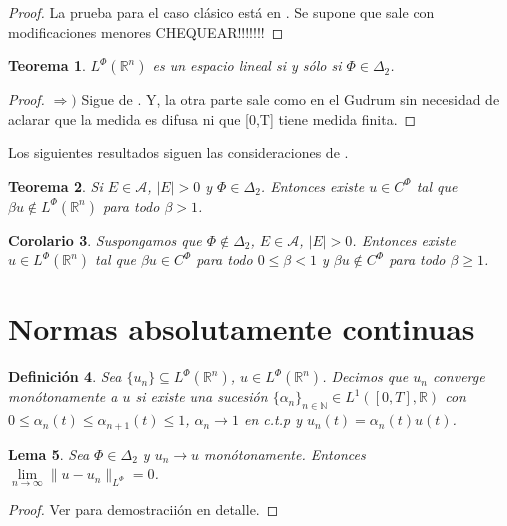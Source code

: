 \documentclass[a4paper,11pt]{amsart}
\theoremstyle{plain}
\newtheorem{thm}{Teorema}[section]
\newtheorem{lem}[thm]{Lema}
\newtheorem{cor}[thm]{Corolario }
\newtheorem{defi}[thm]{Definici\'on}
\theoremstyle{remark}
\theoremstyle{remark}
\newcommand{\rr}{\mathbb{R}}
\newcommand{\nn}{\mathbb{N}}
\numberwithin{equation}{section}
\begin{document}
\begin{proof}
La prueba para el caso cl\'asico est\'a en \cite[Prop. 4, pp. 56-57]{RR91}. Se supone que sale con modificaciones menores CHEQUEAR!!!!!!!
\end{proof}


\begin{thm}
$L^{\Phi}(\rr^n)$ es un espacio lineal si y s\'olo si $\Phi \in \Delta_2$.
\end{thm}

\begin{proof}
$\Rightarrow)$  Sigue de \cite[Thm. 2, pp. 46-47]{RR91}. Y, la otra parte sale como en el Gudrum sin necesidad de aclarar que la medida es difusa ni que  [0,T] tiene medida finita. 
\end{proof}


Los siguientes resultados siguen las consideraciones de \cite[Sub-cap 4]{skaff1969}.

\begin{thm}
Si $E\in \mathcal{A}$,  $|E|>0$ y $\Phi \in \Delta_2$. Entonces existe $u \in C^{\Phi}$ tal que $\beta u \notin L^{\Phi}(\rr^n)$ para todo $\beta>1$.
\end{thm}

\begin{cor}
Suspongamos que $\Phi \notin \Delta_2$, $E \in \mathcal{A}$, $|E|>0$. Entonces existe $u \in L^{\Phi}(\rr^n)$ tal que
$\beta u \in C^{\Phi}$ para todo $0\leq \beta <1$ y $\beta u \notin C^{\Phi}$ para todo $\beta \geq 1$. 
\end{cor}

\section{Normas absolutamente continuas}

\begin{defi}
Sea $\{u_n\}\subseteq L^{\Phi}(\rr^n)$, $u \in L^{\Phi}(\rr^n)$. Decimos que $u_n$ converge mon\'otonamente a $u$ si existe una sucesi\'on $\{\alpha_n\}_{n \in \nn}\in L^1([0,T],\rr)$ con $0\leq \alpha_n(t)\leq \alpha_{n+1}(t)\leq 1$, $\alpha_n \to 1$ en c.t.p y $u_n(t)=\alpha_n(t)u(t)$.
\end{defi}



\begin{lem}
Sea $\Phi \in \Delta_2$ y $u_n \to u$ mon\'otonamente. Entonces $\lim\limits_{n \to \infty} \| u-u_n\|_{L^{\Phi}}=0$.
\end{lem}

\begin{proof}
Ver \cite{DG2001} para demostracii\'on en detalle.
\end{proof}
\end{document}
